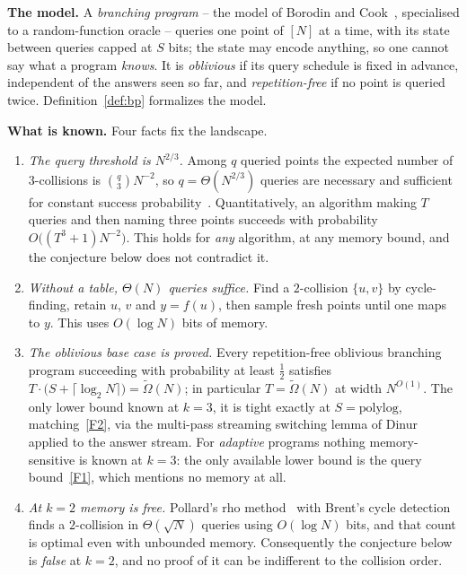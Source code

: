 \documentclass{conjura-conjecture}
\newcommand{\NN}{[N]}
\begin{document}
\smallskip
\noindent\textbf{The model.}
A \emph{branching program} -- the model of Borodin and Cook~\cite{BC82}, specialised to a
random-function oracle -- queries one point of $\NN$ at a time, with its state between queries
capped at $S$ bits; the state may encode anything, so one cannot say what a program \emph{knows}.
It is \emph{oblivious} if its query schedule is fixed in advance, independent of the answers seen
so far, and \emph{repetition-free} if no point is queried twice.  Definition~\ref{def:bp}
formalizes the model.

\smallskip
\noindent\textbf{What is known.}
Four facts fix the landscape.

\begin{enumerate}[label=(F\arabic*),ref=F\arabic*,leftmargin=*,itemsep=1pt,topsep=2pt]
\item\label{F1} \emph{The query threshold is $N^{2/3}$.}  Among $q$ queried points the expected
  number of $3$-collisions is $\binom{q}{3}N^{-2}$, so $q = \Theta(N^{2/3})$ queries are necessary
  and sufficient for constant success probability~\cite{STKT06}.  Quantitatively, an algorithm
  making $T$ queries and then naming three points succeeds with probability
  $O\bigl((T^{3}+1)N^{-2}\bigr)$.  This holds for \emph{any} algorithm, at any memory bound, and
  the conjecture below does not contradict it.
\item\label{F2} \emph{Without a table, $\Theta(N)$ queries suffice.}  Find a $2$-collision
  $\{u,v\}$ by cycle-finding, retain $u$, $v$ and $y = f(u)$, then sample fresh points until one
  maps to $y$.  This uses $O(\log N)$ bits of memory.
\item\label{F3} \emph{The oblivious base case is proved.}  Every repetition-free oblivious
  branching program succeeding with probability at least $\tfrac12$ satisfies
  $T \cdot \bigl(S + \lceil \log_{2} N \rceil\bigr) = \tilde\Omega(N)$; in particular
  $T = \tilde\Omega(N)$ at width $N^{O(1)}$.  The only lower bound known at $k=3$, it is tight
  exactly at $S = \mathrm{polylog}$, matching~\ref{F2}, via the multi-pass streaming switching
  lemma of Dinur~\cite{Din20} applied to the answer stream.  For \emph{adaptive} programs nothing
  memory-sensitive is known at $k=3$: the only available lower bound is the query
  bound~\ref{F1}, which mentions no memory at all.
\item\label{F4} \emph{At $k=2$ memory is free.}  Pollard's rho method~\cite{Pol75} with Brent's
  cycle detection~\cite{Bre80} finds a $2$-collision in $\Theta(\sqrt N)$ queries using
  $O(\log N)$ bits, and that count is optimal even with unbounded memory.  Consequently the
  conjecture below is \emph{false} at $k = 2$, and no proof of it can be indifferent to the
  collision order.
\end{enumerate}
\end{document}
